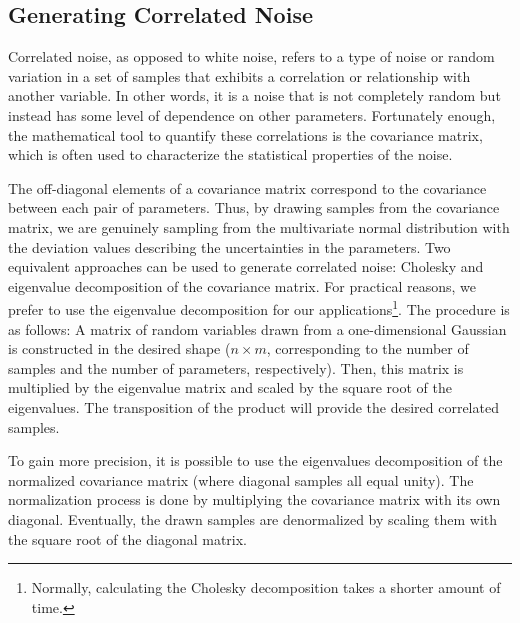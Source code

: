 \documentclass[12pt, TexShade, letterpaper]{report}
\begin{document}
\subsection{Generating Correlated Noise}
\label{chap:method,sub:correlated noise}
Correlated noise, as opposed to white noise, refers to a type of noise or random variation in a set of samples that exhibits a correlation or relationship with another variable. In other words, it is a noise that is not completely random but instead has some level of dependence on other parameters. Fortunately enough, the mathematical tool to quantify these correlations is the covariance matrix, which is often used to characterize the statistical properties of the noise. \par
The off-diagonal elements of a covariance matrix correspond to the covariance between each pair of parameters. Thus, by drawing samples from the covariance matrix, we are genuinely sampling from the multivariate normal distribution with the deviation values describing the uncertainties in the parameters.
Two equivalent approaches can be used to generate correlated noise: Cholesky and eigenvalue decomposition of the covariance matrix. For practical reasons, we prefer to use the eigenvalue decomposition for our applications\footnote{Normally, calculating the Cholesky decomposition takes a shorter amount of time.}. The procedure is as follows: A matrix of random variables drawn from a one-dimensional Gaussian is constructed in the desired shape ($n \times m$, corresponding to the number of samples and the number of parameters, respectively). Then, this matrix is multiplied by the eigenvalue matrix and scaled by the square root of the eigenvalues. The transposition of the product will provide the desired correlated samples. \par
To gain more precision, it is possible to use the eigenvalues decomposition of the normalized covariance matrix (where diagonal samples all equal unity). The normalization process is done by multiplying the covariance matrix with its own diagonal. Eventually, the drawn samples are denormalized by scaling them with the square root of the diagonal matrix.\par
\end{document}
